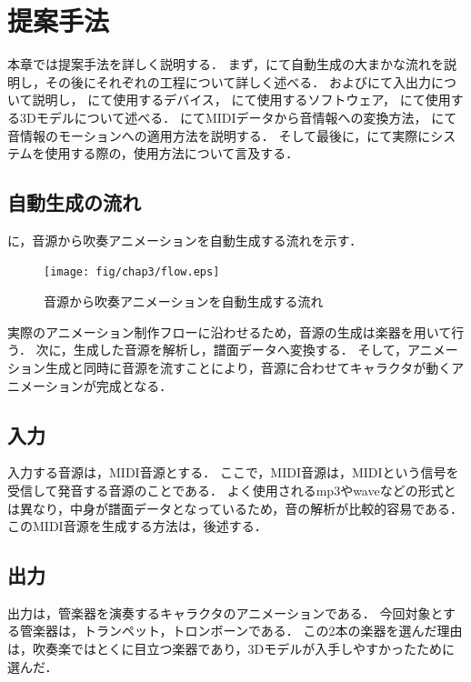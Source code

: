 \chapter{提案手法} \label{chap:algorithm}
本章では提案手法を詳しく説明する．
まず，にて自動生成の大まかな流れを説明し，その後にそれぞれの工程について詳しく述べる．
およびにて入出力について説明し，
にて使用するデバイス，
にて使用するソフトウェア，
にて使用する3Dモデルについて述べる．
にてMIDIデータから音情報への変換方法，
にて音情報のモーションへの適用方法を説明する．
そして最後に，にて実際にシステムを使用する際の，使用方法について言及する．

\section{自動生成の流れ} \label{sec:flow}
に，音源から吹奏アニメーションを自動生成する流れを示す．\\
\begin{figure}[h]
	\centering
	\texttt{[image: fig/chap3/flow.eps]}
	\caption{音源から吹奏アニメーションを自動生成する流れ}
	\label{fig:flow}
\end{figure}
\indent
実際のアニメーション制作フローに沿わせるため，音源の生成は楽器を用いて行う．
次に，生成した音源を解析し，譜面データへ変換する．
そして，アニメーション生成と同時に音源を流すことにより，音源に合わせてキャラクタが動くアニメーションが完成となる．

\section{入力} \label{sec:input}
入力する音源は，MIDI音源とする．
ここで，MIDI音源は，MIDIという信号を受信して発音する音源のことである．
よく使用されるmp3やwaveなどの形式とは異なり，中身が譜面データとなっているため，音の解析が比較的容易である．\\
\indent
このMIDI音源を生成する方法は，後述する．

\section{出力} \label{sec:output}
出力は，管楽器を演奏するキャラクタのアニメーションである．
今回対象とする管楽器は，トランペット，トロンボーンである．
この2本の楽器を選んだ理由は，吹奏楽ではとくに目立つ楽器であり，3Dモデルが入手しやすかったために選んだ．

